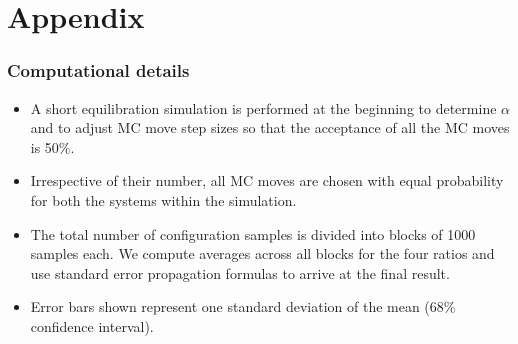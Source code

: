 \documentclass[xcolor=svgnames]{beamer}
\begin{document}
    \section*{Appendix}
    \iffalse
        \begin{frame}
            \frametitle{Computational details}
            \begin{itemize}
                \item A short equilibration simulation is performed at the beginning to determine $\alpha$ and to adjust MC move step sizes so that the acceptance of all the MC moves is 50\%.
                \item Irrespective of their number, all MC moves are chosen with equal probability for both the systems within the simulation.
                \item The total number of configuration samples is divided into blocks of 1000 samples each. We compute averages across all blocks for the four ratios and use standard error propagation formulas to arrive at the final result.
                \item Error bars shown represent one standard deviation of the mean (68\% confidence interval).
            \end{itemize}
        \end{frame}
\end{document}
